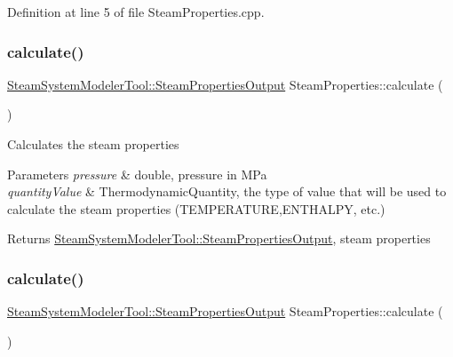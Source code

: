 Definition at line 5 of file Steam\+Properties.\+cpp.

\mbox{\label{class_steam_properties_a8c729e006c34157435d5476fb31e30b5}} 
\subsubsection{\texorpdfstring{calculate()}{calculate()}\hspace{0.1cm}{\footnotesize\ttfamily [2/3]}}
{\footnotesize\ttfamily \hyperlink{struct_steam_system_modeler_tool_1_1_steam_properties_output}{Steam\+System\+Modeler\+Tool\+::\+Steam\+Properties\+Output} Steam\+Properties\+::calculate (\begin{DoxyParamCaption}{ }\end{DoxyParamCaption})}

Calculates the steam properties


\begin{DoxyParams}{Parameters}
{\em pressure} & double, pressure in M\+Pa \\
\hline
{\em quantity\+Value} & Thermodynamic\+Quantity, the type of value that will be used to calculate the steam properties (T\+E\+M\+P\+E\+R\+A\+T\+U\+RE,E\+N\+T\+H\+A\+L\+PY, etc.)\\
\hline
\end{DoxyParams}
\begin{DoxyReturn}{Returns}
\hyperlink{struct_steam_system_modeler_tool_1_1_steam_properties_output}{Steam\+System\+Modeler\+Tool\+::\+Steam\+Properties\+Output}, steam properties 
\end{DoxyReturn}
\mbox{\label{class_steam_properties_a8c729e006c34157435d5476fb31e30b5}} 
\subsubsection{\texorpdfstring{calculate()}{calculate()}\hspace{0.1cm}{\footnotesize\ttfamily [3/3]}}
{\footnotesize\ttfamily \hyperlink{struct_steam_system_modeler_tool_1_1_steam_properties_output}{Steam\+System\+Modeler\+Tool\+::\+Steam\+Properties\+Output} Steam\+Properties\+::calculate (\begin{DoxyParamCaption}{ }\end{DoxyParamCaption})}

